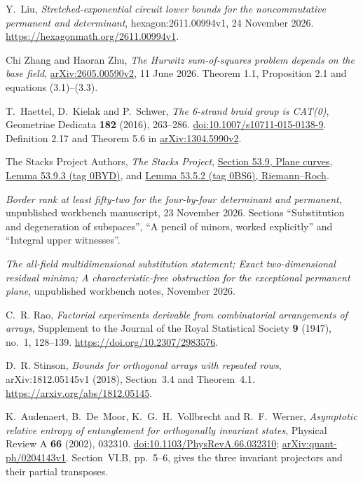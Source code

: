 Y.~Liu, \emph{Stretched-exponential circuit lower bounds for
the noncommutative permanent and determinant},
hexagon:2611.00994v1, 24 November 2026.
\url{https://hexagonmath.org/2611.00994v1}.

 Chi Zhang and Haoran Zhu, \emph{The Hurwitz sum-of-squares problem depends on the base field}, \href{https://arxiv.org/abs/2605.00590v2}{arXiv:2605.00590v2}, 11 June 2026. Theorem 1.1, Proposition 2.1 and equations (3.1)--(3.3).


T.~Haettel, D.~Kielak and P.~Schwer,
\emph{The 6-strand braid group is CAT(0)},
Geometriae Dedicata \textbf{182} (2016), 263--286.
\href{https://doi.org/10.1007/s10711-015-0138-9}{doi:10.1007/s10711-015-0138-9}.
Definition 2.17 and Theorem 5.6 in
\href{https://arxiv.org/abs/1304.5990v2}{arXiv:1304.5990v2}.

The Stacks Project Authors, \emph{The Stacks Project},
\href{https://stacks.math.columbia.edu/tag/0BYA}{Section 53.9, Plane curves},
\href{https://stacks.math.columbia.edu/tag/0BYD}{Lemma 53.9.3 (tag 0BYD)},
and \href{https://stacks.math.columbia.edu/tag/0BS6}{Lemma 53.5.2 (tag 0BS6), Riemann--Roch}.

\emph{Border rank at least fifty-two for the four-by-four determinant
and permanent}, unpublished workbench manuscript, 23 November 2026.
Sections ``Substitution and degeneration of subspaces'',
``A pencil of minors, worked explicitly'' and ``Integral upper witnesses''.

\emph{The all-field multidimensional substitution statement;
Exact two-dimensional residual minima;
A characteristic-free obstruction for the exceptional permanent plane},
unpublished workbench notes, November 2026.


C.~R. Rao, \emph{Factorial experiments derivable from combinatorial arrangements of arrays},
Supplement to the Journal of the Royal Statistical Society \textbf{9} (1947), no.~1, 128--139.
\url{https://doi.org/10.2307/2983576}.


D.~R. Stinson, \emph{Bounds for orthogonal arrays with repeated rows},
arXiv:1812.05145v1 (2018), Section~3.4 and Theorem~4.1.
\url{https://arxiv.org/abs/1812.05145}.


 K.~Audenaert, B.~De~Moor, K.~G.~H.~Vollbrecht and R.~F.~Werner,
\emph{Asymptotic relative entropy of entanglement for orthogonally invariant states},
Physical Review A \textbf{66} (2002), 032310.
\href{https://doi.org/10.1103/PhysRevA.66.032310}{doi:10.1103/PhysRevA.66.032310};
\href{https://arxiv.org/abs/quant-ph/0204143v1}{arXiv:quant-ph/0204143v1}.
Section~VI.B, pp.~5--6, gives the three invariant projectors and their partial transposes.


